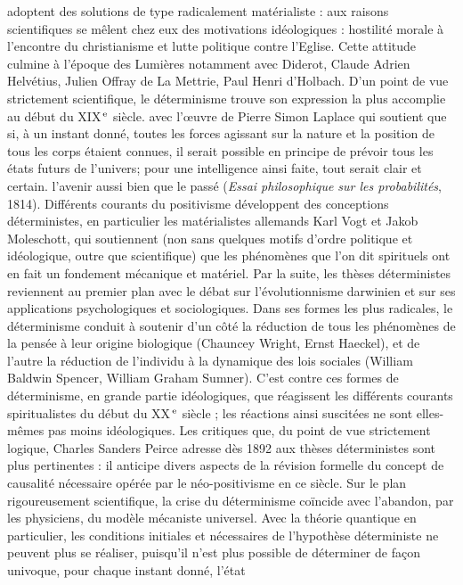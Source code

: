 adoptent des solutions de type radicalement matérialiste : aux raisons scientifiques se mêlent chez eux des motivations
idéologiques : hostilité morale à l’encontre du christianisme et lutte politique
contre l'Eglise. Cette attitude culmine à
l’époque des Lumières notamment avec
Diderot, Claude Adrien Helvétius, Julien
Offray de La Mettrie, Paul Henri d'Holbach. D'un point de vue strictement scientifique, le déterminisme trouve son
expression la plus accomplie au début du
{\footnotesize XIX}$^\text{\,e}$ siècle. avec l’œuvre de Pierre Simon
Laplace qui soutient que si, à un instant
donné, toutes les forces agissant sur la
nature et la position de tous les corps
étaient connues, il serait possible en principe de prévoir tous les états futurs de
l'univers; pour une intelligence ainsi
faite, tout serait clair et certain. l’avenir
aussi bien que le passé ({\it Essai philosophique sur les probabilités}, 1814). Différents courants du positivisme développent
des conceptions déterministes, en particulier les matérialistes allemands Karl Vogt
et Jakob Moleschott, qui soutiennent
(non sans quelques motifs d’ordre politique et idéologique, outre que scientifique) que les phénomènes que l’on dit
spirituels ont en fait un fondement mécanique et matériel. Par la suite, les thèses
déterministes reviennent au premier plan
avec le débat sur l’évolutionnisme darwinien et sur ses applications psychologiques et sociologiques. Dans ses formes
les plus radicales, le déterminisme conduit
à soutenir d’un côté la réduction de tous
les phénomènes de la pensée à leur origine biologique (Chauncey Wright, Ernst
Haeckel), et de l’autre la réduction de
l'individu à la dynamique des lois sociales
(William Baldwin Spencer, William Graham Sumner). C’est contre ces formes de
déterminisme, en grande partie idéologiques, que réagissent les différents courants spiritualistes du début du {\footnotesize XX}$^\text{\,e}$ siècle ; les
réactions ainsi suscitées ne sont elles-mêmes pas moins idéologiques. Les critiques que, du point de vue strictement
logique, Charles Sanders Peirce adresse
dès 1892 aux thèses déterministes sont
plus pertinentes : il anticipe divers aspects
de la révision formelle du concept de
causalité nécessaire opérée par le néo-positivisme en ce siècle. Sur le plan rigoureusement scientifique, la crise du
déterminisme coïncide avec l’abandon,
par les physiciens, du modèle mécaniste
universel. Avec la théorie quantique en
particulier, les conditions initiales et
nécessaires de l'hypothèse déterministe
ne peuvent plus se réaliser, puisqu'il n’est
plus possible de déterminer de façon univoque, pour chaque instant donné, l’état
